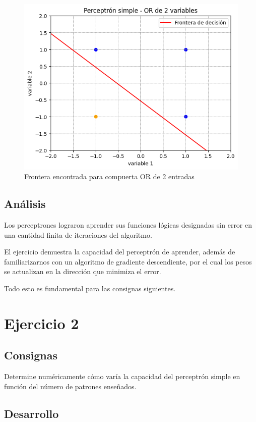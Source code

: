 \documentclass[11pt]{article} %
\begin{document}
\begin{figure}[h!]
	\centering
	\includegraphics[width=0.7\linewidth]{../imgs/ej1/ORFRONT}
	\caption[]{Frontera encontrada para compuerta OR de 2 entradas}
	\label{fig:orfront}
\end{figure}


\subsection{Análisis}

Los perceptrones lograron aprender sus funciones lógicas designadas sin error en una cantidad finita de iteraciones del algoritmo.

El ejercicio demuestra la capacidad del perceptrón de aprender, además de familiarizarnos con un algoritmo de gradiente descendiente, por el cual los pesos se actualizan en la dirección que minimiza el error.

Todo esto es fundamental para las consignas siguientes.


\clearpage

\section{Ejercicio 2}

\subsection{Consignas}

Determine numéricamente cómo varía la capacidad del perceptrón simple en función del número de patrones enseñados.


\subsection{Desarrollo}
\end{document}
